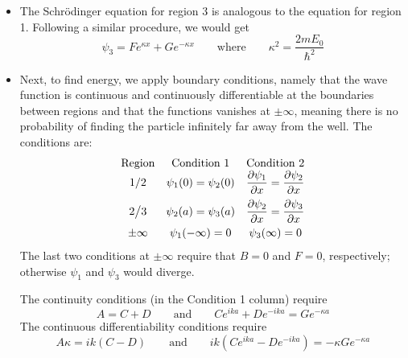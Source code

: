 \documentclass[11pt, a4paper]{article}
\newcommand{\eqtext}[1]{\qquad \text{#1} \qquad}
\newcommand{\Schro}{Schr\"{o}dinger\xspace}
\begin{document}
\begin{itemize}
	\item The \Schro equation for region 3 is analogous to the equation for region 1. Following a similar procedure, we would get
	\begin{equation*}
		\psi_{3} = Fe^{\kappa x} + Ge^{-\kappa x} \eqtext{where} \kappa^{2} = \frac{2mE_{0}}{\hbar^{2}}
	\end{equation*}
	
	\item Next, to find energy, we apply boundary conditions, namely that the wave function is continuous and continuously differentiable at the boundaries between regions and that the functions vanishes at $ \pm \infty $, meaning there is no probability of finding the particle infinitely far away from the well. The conditions are:
	\[
		\begin{array}{ccc}
			\text{Region} & \text{Condition 1} & \text{Condition 2}\\
			1/2 & \psi_{1}(0) = \psi_{2}(0) &\displaystyle \pdv{\psi_{1}}{x} (0) = \pdv{\psi_{2}}{x} (0)\\[3mm]
			2\big/3 & \psi_{2}(a) = \psi_{3} (a) &\displaystyle \pdv{\psi_{2}}{x} (a) = \pdv{\psi_{3}}{x} (a)\\[2.5mm]
			\pm \infty & \psi_{1}(-\infty) = 0 & \psi_{3}(\infty) = 0
		\end{array}
	\]
	The last two conditions at $ \pm \infty $ require that $ B = 0 $ and $ F = 0 $, respectively; otherwise $ \psi_{1} $ and $ \psi_{3} $ would diverge.
	
	The continuity conditions (in the Condition 1 column) require
	\begin{equation*}
		A = C + D \eqtext{and} Ce^{ika} + De^{-ika} = Ge^{-\kappa a}
	\end{equation*}
	The continuous differentiability conditions require 
	\begin{equation*}
		A\kappa = ik(C-D) \eqtext{and} ik(Ce^{ika} - De^{-ika}) = - \kappa Ge^{-\kappa a}
	\end{equation*}
	

\end{itemize}
\end{document}
